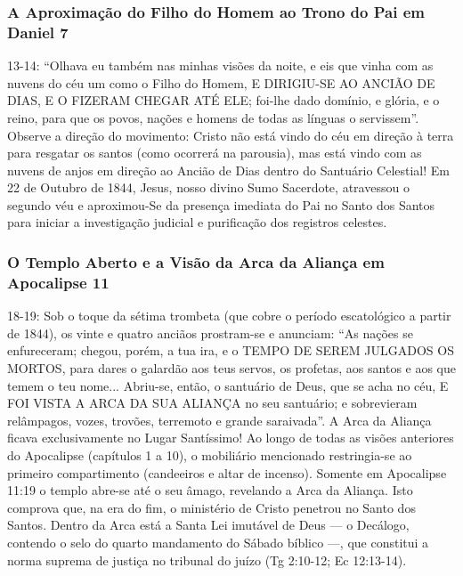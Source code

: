 \subsubsection*{A Aproximação do Filho do Homem ao Trono do Pai em Daniel 7}
13-14:
``Olhava eu também nas minhas visões da noite, e eis que vinha com as nuvens do céu um como o Filho do Homem, E DIRIGIU-SE AO ANCIÃO DE DIAS, E O FIZERAM CHEGAR ATÉ ELE; foi-lhe dado domínio, e glória, e o reino, para que os povos, nações e homens de todas as línguas o servissem''.
Observe a direção do movimento: Cristo não está vindo do céu em direção à terra para resgatar os santos (como ocorrerá na parousia), mas está vindo com as nuvens de anjos em direção ao Ancião de Dias dentro do Santuário Celestial! Em 22 de Outubro de 1844, Jesus, nosso divino Sumo Sacerdote, atravessou o segundo véu e aproximou-Se da presença imediata do Pai no Santo dos Santos para iniciar a investigação judicial e purificação dos registros celestes.


\subsubsection*{O Templo Aberto e a Visão da Arca da Aliança em Apocalipse 11}
18-19:
Sob o toque da sétima trombeta (que cobre o período escatológico a partir de 1844), os vinte e quatro anciãos prostram-se e anunciam: ``As nações se enfureceram; chegou, porém, a tua ira, e o TEMPO DE SEREM JULGADOS OS MORTOS, para dares o galardão aos teus servos, os profetas, aos santos e aos que temem o teu nome... Abriu-se, então, o santuário de Deus, que se acha no céu, E FOI VISTA A ARCA DA SUA ALIANÇA no seu santuário; e sobrevieram relâmpagos, vozes, trovões, terremoto e grande saraivada''.
A Arca da Aliança ficava exclusivamente no Lugar Santíssimo! Ao longo de todas as visões anteriores do Apocalipse (capítulos 1 a 10), o mobiliário mencionado restringia-se ao primeiro compartimento (candeeiros e altar de incenso). Somente em Apocalipse 11:19 o templo abre-se até o seu âmago, revelando a Arca da Aliança. Isto comprova que, na era do fim, o ministério de Cristo penetrou no Santo dos Santos. Dentro da Arca está a Santa Lei imutável de Deus — o Decálogo, contendo o selo do quarto mandamento do Sábado bíblico —, que constitui a norma suprema de justiça no tribunal do juízo (Tg 2:10-12; Ec 12:13-14).


